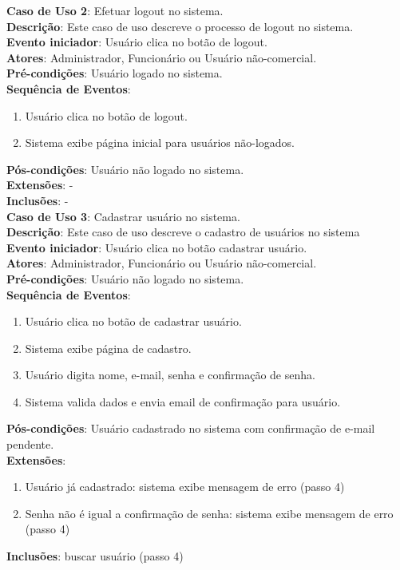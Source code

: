 \documentclass[]{politex}
\begin{document}
\noindent \textbf{Caso de Uso 2}: Efetuar logout no sistema. \\
\textbf{Descrição}: Este caso de uso descreve o processo de logout no sistema. \\
\textbf{Evento iniciador}: Usuário clica no botão de logout. \\
\textbf{Atores}: Administrador, Funcionário ou Usuário não-comercial. \\
\textbf{Pré-condições}: Usuário logado no sistema. \\
\textbf{Sequência de Eventos}: 
\begin{enumerate}
\item Usuário clica no botão de logout.
\item Sistema exibe página inicial para usuários não-logados.
\end{enumerate}
\textbf{Pós-condições}: Usuário não logado no sistema. \\
\textbf{Extensões}: - \\
\textbf{Inclusões}: - \\

\noindent \textbf{Caso de Uso 3}: Cadastrar usuário no sistema.  \\
\textbf{Descrição}: Este caso de uso descreve o cadastro de usuários no sistema \\
\textbf{Evento iniciador}: Usuário clica no botão cadastrar usuário. \\
\textbf{Atores}: Administrador, Funcionário ou Usuário não-comercial. \\
\textbf{Pré-condições}: Usuário não logado no sistema. \\
\textbf{Sequência de Eventos}: 
\begin{enumerate}
\item Usuário clica no botão de cadastrar usuário.
\item Sistema exibe página de cadastro.
\item Usuário digita nome, e-mail, senha e confirmação de senha.
\item Sistema valida dados e envia email de confirmação para usuário.
\end{enumerate}
\textbf{Pós-condições}: Usuário cadastrado no sistema com confirmação de e-mail pendente. \\
\textbf{Extensões}:
\begin{enumerate}
\item Usuário já cadastrado: sistema exibe mensagem de erro (passo 4)
\item Senha não é igual a confirmação de senha: sistema exibe mensagem de erro (passo 4)
\end{enumerate}
\textbf{Inclusões}: buscar usuário (passo 4) \\
\end{document}
